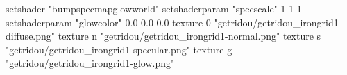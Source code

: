 setshader "bumpspecmapglowworld"
setshaderparam "specscale" 1 1 1
setshaderparam "glowcolor" 0.0 0.0 0.0
texture 0 "getridou/getridou_irongrid1-diffuse.png"
texture n "getridou/getridou_irongrid1-normal.png"
texture s "getridou/getridou_irongrid1-specular.png"
texture g "getridou/getridou_irongrid1-glow.png"